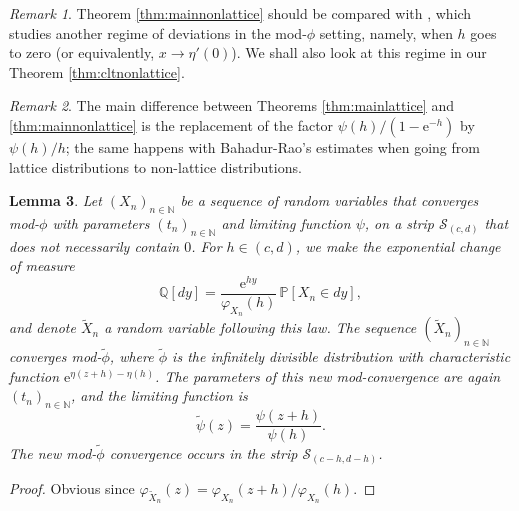 \documentclass[12pt,a4paper,reqno]{amsart}
\newtheorem{lemma}{Lemma}[section]
\theoremstyle{remark}
\newtheorem{remark}[lemma]{Remark}
\newcommand{\N}{\mathbb{N}}
\newcommand{\E}{\mathrm{e}}
\newcommand{\proba}{\mathbb{P}}
\begin{document}
\begin{remark}
Theorem \ref{thm:mainnonlattice} should be compared with \cite[Theorem 1]{Hwa96}, which studies another regime of deviations in the mod-$\phi$ setting, namely, when $h$ goes to zero (or equivalently, $x \to \eta'(0)$). We shall also look at this regime in our Theorem \ref{thm:cltnonlattice}.
\end{remark}

\begin{remark}
The main difference between Theorems \ref{thm:mainlattice} and \ref{thm:mainnonlattice} is the replacement of the factor $\psi(h)/(1-\E^{-h})$ by $\psi(h)/h$; the same happens with Bahadur-Rao's estimates when going from lattice distributions to non-lattice distributions. 
\end{remark}
\medskip 

\begin{lemma}\label{lem:exponchange}
Let $(X_n)_{n \in \N}$ be a sequence of random variables that converges mod-$\phi$ with parameters $(t_n)_{n \in \N}$ and limiting function $\psi$, on a strip $\mathcal{S}_{(c,d)}$ that does not necessarily contain $0$. For $h \in (c,d)$, we make the exponential change of measure
$$\mathbb{Q}[dy]=\frac{\E^{hy}}{\varphi_{X_{n}}(h)}\,\proba[X_{n} \in dy],$$
and denote $\widetilde{X}_{n}$ a random variable following this law. The sequence $(\widetilde{X}_n)_{n \in \N}$ converges mod-$\widetilde{\phi}$, where $\widetilde{\phi}$ is the infinitely divisible distribution with characteristic function $\E^{\eta(z+h)-\eta(h)}$. The parameters of this new mod-convergence are again $(t_n)_{n \in \N}$, and the limiting function is
$$\widetilde{\psi}(z)=\frac{\psi(z+h)}{\psi(h)}.$$
The new mod-$\widetilde{\phi}$ convergence occurs in the strip $\mathcal{S}_{(c-h,d-h)}$.
\end{lemma}

\begin{proof}
Obvious since $\varphi_{\widetilde{X}_n}(z)=\varphi_{X_n}(z+h)/\varphi_{X_n}(h)$.
\end{proof}
\end{document}
